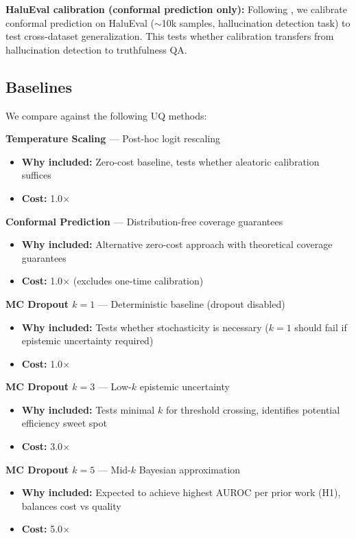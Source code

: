 \textbf{HaluEval calibration (conformal prediction only):} Following \cite{su2024conformal}, we calibrate conformal prediction on HaluEval ($\sim$10k samples, hallucination detection task) to test cross-dataset generalization. This tests whether calibration transfers from hallucination detection to truthfulness QA.

\subsection{Baselines}

We compare against the following UQ methods:

\textbf{Temperature Scaling \cite{guo2017calibration}} --- Post-hoc logit rescaling
\begin{itemize}
    \item \textbf{Why included:} Zero-cost baseline, tests whether aleatoric calibration suffices
    \item \textbf{Cost:} 1.0$\times$
\end{itemize}

\textbf{Conformal Prediction \cite{su2024conformal}} --- Distribution-free coverage guarantees
\begin{itemize}
    \item \textbf{Why included:} Alternative zero-cost approach with theoretical coverage guarantees
    \item \textbf{Cost:} 1.0$\times$ (excludes one-time calibration)
\end{itemize}

\textbf{MC Dropout $k=1$} --- Deterministic baseline (dropout disabled)
\begin{itemize}
    \item \textbf{Why included:} Tests whether stochasticity is necessary ($k=1$ should fail if epistemic uncertainty required)
    \item \textbf{Cost:} 1.0$\times$
\end{itemize}

\textbf{MC Dropout $k=3$} --- Low-$k$ epistemic uncertainty
\begin{itemize}
    \item \textbf{Why included:} Tests minimal $k$ for threshold crossing, identifies potential efficiency sweet spot
    \item \textbf{Cost:} 3.0$\times$
\end{itemize}

\textbf{MC Dropout $k=5$} --- Mid-$k$ Bayesian approximation
\begin{itemize}
    \item \textbf{Why included:} Expected to achieve highest AUROC per prior work (H1), balances cost vs quality
    \item \textbf{Cost:} 5.0$\times$
\end{itemize}

